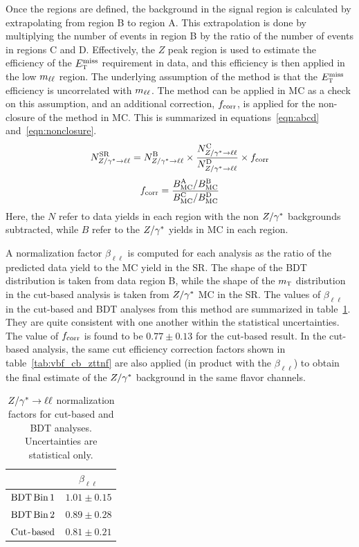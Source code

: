 Once the regions are defined, the background in the signal region is calculated by extrapolating from region B to region A. This extrapolation is done by multiplying the number of events in region B by the ratio of the number of events in regions C and D. Effectively, the $Z$ peak region is used to estimate the efficiency of the $E_{\textrm{\footnotesize\sc t}}^{\rm miss}$ requirement in data, and this efficiency is then applied in the low $m_{\ell\ell}$ region. The underlying assumption of the method is that the $E_{\textrm{\footnotesize\sc t}}^{\rm miss}$ efficiency is uncorrelated with $m_{\ell\ell}$. The method can be applied in MC as a check on this assumption, and an additional correction, $f_{\rm corr}$, is applied for the non-closure of the method in MC. This is summarized in equations~\ref{eqn:abcd} and~\ref{eqn:nonclosure}.
%
\begin{equation}
N^{\rm SR}_{Z/\gamma^{\ast}\to\ell\ell} = N^{\rm B}_{Z/\gamma^{\ast}\to\ell\ell}  \times \frac{N^{\rm C}_{Z/\gamma^{\ast}\to\ell\ell}}{N^{\rm D}_{Z/\gamma^{\ast}\to\ell\ell} } \times f_{\rm corr}
\label{eqn:abcd}
\end{equation}
%
\begin{equation}
f_{\rm corr} = \frac{B_{\rm MC}^{\rm A}/B_{\rm MC}^{\rm B}}{B_{\rm MC}^{\rm C}/B_{\rm MC}^{\rm D}}
\label{eqn:nonclosure}
\end{equation}
%
Here, the $N$ refer to data yields in each region with the non $Z/\gamma^{\ast}$ backgrounds subtracted, while $B$ refer to the $Z/\gamma^{\ast}$ yields in MC in each region.

A normalization factor $\beta_{\ell\ell}$ is computed for each analysis as the ratio of the predicted data yield to the MC yield in the SR. The shape of the BDT distribution is taken from data region B, while the shape of the $m_{\textrm{\footnotesize\sc t}}$ distribution in the cut-based analysis is taken from $Z/\gamma^{\ast}$ MC in the SR. The values of $\beta_{\ell\ell}$ in the cut-based and BDT analyses from this method are summarized in table~\ref{tab:vbf_sf_nf}. They are quite consistent with one another within the statistical uncertainties. The value of $f_{\rm corr}$ is found to be $0.77\pm 0.13$ for the cut-based result. In the cut-based analysis, the same cut efficiency correction factors shown in table~\ref{tab:vbf_cb_zttnf} are also applied (in product with the $\beta_{\ell\ell}$) to obtain the final estimate of the $Z/\gamma^{\ast}$ background in the same flavor channels. 

\begin{table}[h!]
\centering
\captionsetup{justification=centering}
\begin{tabular}{|c|c|}
\hline
& $\beta_{\ell\ell}$ \\ \hline
$\rm BDT\,Bin\,1$ & $1.01 \pm 0.15$ \\ \hline
$\rm BDT\,Bin\,2$ & $0.89 \pm 0.28$ \\ \hline
$\rm Cut$-$\rm based$ & $0.81 \pm 0.21$ \\ \hline
\end{tabular}
\caption{$Z/\gamma^{\ast} \to \ell\ell$ normalization factors for cut-based and BDT analyses. Uncertainties are statistical only.}
\label{tab:vbf_sf_nf}
\end{table}

